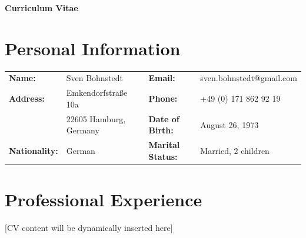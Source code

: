 \documentclass[a4paper,11pt]{article}
\begin{document}
\begin{center}
    {\Huge\bfseries Curriculum Vitae}
\end{center}

\section*{Personal Information}
\begin{tabularx}{\textwidth}{@{}l X l X@{}}
    \textbf{Name:} & Sven Bohnstedt & \textbf{Email:} & sven.bohnstedt@gmail.com \\
    \textbf{Address:} & Emkendorfstraße 10a & \textbf{Phone:} & +49 (0) 171 862 92 19 \\
    & 22605 Hamburg, Germany & \textbf{Date of Birth:} & August 26, 1973 \\
    \textbf{Nationality:} & German & \textbf{Marital Status:} & Married, 2 children
\end{tabularx}

\section{Professional Experience}

[CV content will be dynamically inserted here]
\end{document}
